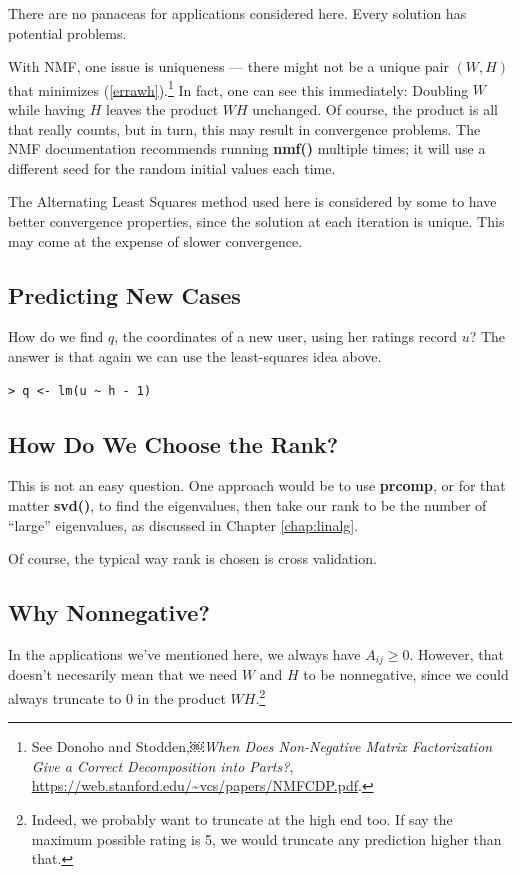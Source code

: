 There are no panaceas for applications considered here.  Every solution
has potential problems.

With NMF, one issue is uniqueness --- there might not be a unique pair
$(W,H)$ that minimizes (\ref{errawh}).\footnote{See Donoho and
Stodden,￼{\it When Does Non-Negative Matrix Factorization Give a Correct
Decomposition into Parts?},
\url{https://web.stanford.edu/~vcs/papers/NMFCDP.pdf}.}  In fact, one
can see this immediately:  Doubling $W$ while having $H$ leaves the
product $WH$ unchanged.  Of course, the product is all that really
counts, but in turn, this may result in convergence problems. The NMF
documentation recommends running {\bf nmf()} multiple times; it will use
a different seed for the random initial values each time.

The Alternating Least Squares method used here is considered by some to
have better convergence properties, since the solution at each iteration
is unique.  This may come at the expense of slower convergence.

\subsection{Predicting New Cases}

How do we find $q$, the coordinates of a new user, using her ratings
record $u$?  The answer is that again we can use the least-squares idea
above.

\begin{lstlisting}
> q <- lm(u ~ h - 1)
\end{lstlisting}

\subsection{How Do We Choose the Rank?}

This is not an easy question.  One approach would be to use
\textbf{prcomp}, or for that matter \textbf{svd()}, to find the
eigenvalues, then take our rank to be the number of ``large''
eigenvalues, as discussed in Chapter \ref{chap:linalg}.  

Of course, the typical way rank is chosen is cross validation.

\subsection{Why Nonnegative?}

In the applications we've mentioned here, we always have $A_{ij} \geq 0$.
However, that doesn't necesarily mean that we need $W$ and $H$ to be
nonnegative, since we could always truncate to 0 in the product
$WH$.\footnote{Indeed, we probably want to truncate at the high end too.
If say the maximum possible rating is 5, we would truncate any
prediction higher than that.}

